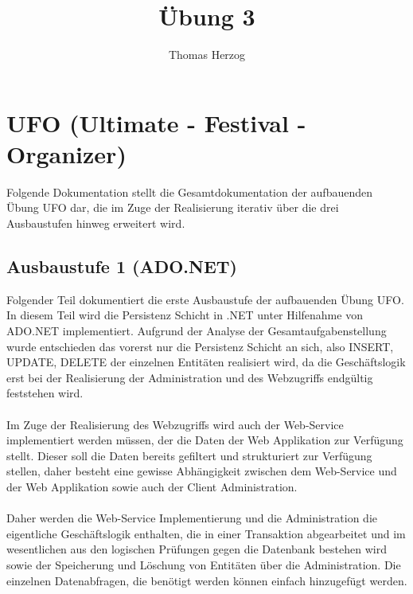 \documentclass[11pt, a4paper, twoside]{article}   	%
\title{Übung 3}
\author{Thomas Herzog}
\begin{document}
\setlength{\headheight}{15mm}
%
{\color{myred}
	\section
		{UFO (Ultimate - Festival - Organizer)}
}
Folgende Dokumentation stellt die Gesamtdokumentation der aufbauenden Übung UFO dar, die im Zuge der Realisierung iterativ über die drei Ausbaustufen hinweg erweitert wird. \\

\subsection{Ausbaustufe 1 (ADO.NET)}
Folgender Teil dokumentiert die erste Ausbaustufe der aufbauenden Übung UFO. In diesem Teil wird die Persistenz Schicht in .NET unter Hilfenahme von ADO.NET implementiert. Aufgrund der Analyse der Gesamtaufgabenstellung wurde entschieden das vorerst nur die Persistenz Schicht an sich, also INSERT, UPDATE, DELETE der einzelnen Entitäten realisiert wird, da die Geschäftslogik erst bei der Realisierung der Administration und des Webzugriffs endgültig feststehen wird. \\\\
Im Zuge der Realisierung des Webzugriffs wird auch der Web-Service implementiert werden müssen, der die Daten der Web Applikation zur Verfügung stellt. Dieser soll die Daten bereits gefiltert und strukturiert zur Verfügung stellen, daher besteht eine gewisse Abhängigkeit zwischen dem Web-Service und der Web Applikation sowie auch der Client Administration.\\\\
Daher werden die Web-Service Implementierung und die Administration die eigentliche Geschäftslogik enthalten, die 
in einer Transaktion abgearbeitet und im wesentlichen aus den logischen Prüfungen gegen die Datenbank bestehen wird sowie der Speicherung und Löschung von Entitäten über die Administration. Die einzelnen Datenabfragen, die benötigt werden können einfach hinzugefügt werden.
\end{document}
